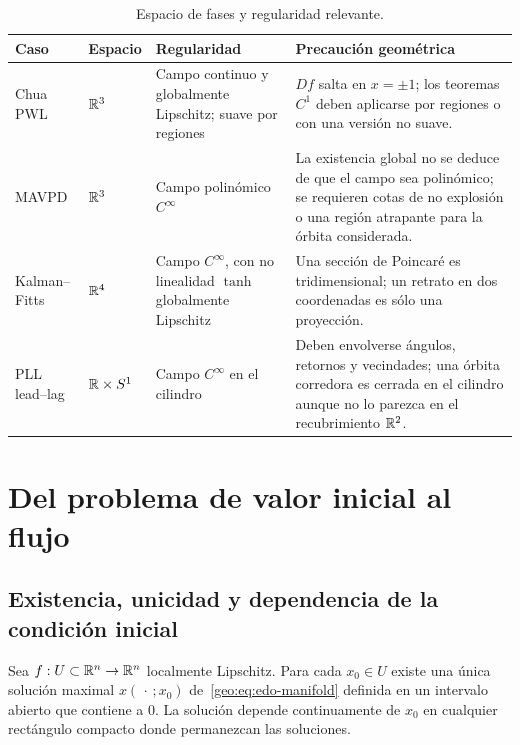 \begin{table}[H]
\centering
\caption{Espacio de fases y regularidad relevante.}
\label{geo:tab:regularity-cases}
\small
\begin{tabularx}{\textwidth}{@{}L{0.18\textwidth}L{0.16\textwidth}L{0.25\textwidth}Y@{}}
\toprule
Caso & Espacio & Regularidad & Precaución geométrica \\
\midrule
Chua PWL & \(\mathbb{R}^3\) & Campo continuo y globalmente Lipschitz; suave por
regiones & \(Df\) salta en \(x=\pm1\); los teoremas \(C^1\) deben aplicarse por
regiones o con una versión no suave. \\
MAVPD & \(\mathbb{R}^3\) & Campo polinómico \(C^\infty\) & La existencia global no se
deduce de que el campo sea polinómico; se requieren cotas de no explosión o
una región atrapante para la órbita considerada. \\
Kalman--Fitts & \(\mathbb{R}^4\) & Campo \(C^\infty\), con no linealidad
\(\tanh\) globalmente Lipschitz & Una sección de Poincaré es tridimensional;
un retrato en dos coordenadas es sólo una proyección. \\
PLL lead--lag & \(\mathbb{R}\times S^1\) & Campo \(C^\infty\) en el cilindro & Deben
envolverse ángulos, retornos y vecindades; una órbita corredora es cerrada en
el cilindro aunque no lo parezca en el recubrimiento \(\mathbb{R}^2\). \\
\bottomrule
\end{tabularx}
\end{table}

\HAFOStudyNeedspace
\section{Del problema de valor inicial al flujo}
\label{sec:geo-flujo}

\HAFOCardFlow

\subsection{Existencia, unicidad y dependencia de la condición inicial}

\begin{proposition}
Sea \(f:U\subset\mathbb{R}^n\to\mathbb{R}^n\) localmente Lipschitz. Para cada
\(x_0\in U\) existe una única solución maximal
\(x(\,\cdot\,;x_0)\) de~\eqref{geo:eq:edo-manifold} definida en un intervalo
abierto que contiene a \(0\). La solución depende continuamente de \(x_0\) en
cualquier rectángulo compacto donde permanezcan las soluciones.
\end{proposition}


